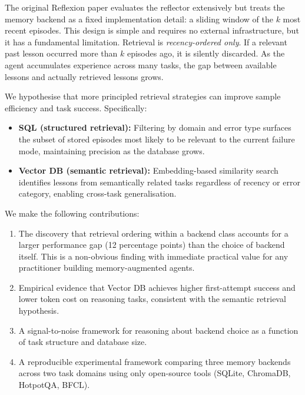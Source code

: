 \documentclass{article}
\begin{document}
The original Reflexion paper evaluates the reflector extensively but treats
the memory backend as a fixed implementation detail: a sliding window of the
$k$ most recent episodes. This design is simple and requires no external
infrastructure, but it has a fundamental limitation. Retrieval is
\emph{recency-ordered only}. If a relevant past lesson occurred more than $k$
episodes ago, it is silently discarded. As the agent accumulates experience
across many tasks, the gap between available lessons and actually retrieved
lessons grows.

We hypothesise that more principled retrieval strategies can improve sample
efficiency and task success. Specifically:

\begin{itemize}
  \item \textbf{SQL (structured retrieval):} Filtering by domain and error
    type surfaces the subset of stored episodes most likely to be relevant
    to the current failure mode, maintaining precision as the database grows.
  \item \textbf{Vector DB (semantic retrieval):} Embedding-based similarity
    search identifies lessons from semantically related tasks regardless of
    recency or error category, enabling cross-task generalisation.
\end{itemize}

We make the following contributions:
\begin{enumerate}
  \item The discovery that retrieval ordering within a backend class accounts
    for a larger performance gap (12 percentage points) than the choice of
    backend itself. This is a non-obvious finding with immediate practical
    value for any practitioner building memory-augmented agents.
  \item Empirical evidence that Vector DB achieves higher first-attempt
    success and lower token cost on reasoning tasks, consistent with the
    semantic retrieval hypothesis.
  \item A signal-to-noise framework for reasoning about backend choice as a
    function of task structure and database size.
  \item A reproducible experimental framework comparing three memory backends
    across two task domains using only open-source tools (SQLite, ChromaDB,
    HotpotQA, BFCL).
\end{enumerate}

\end{document}

